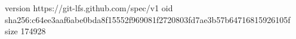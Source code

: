version https://git-lfs.github.com/spec/v1
oid sha256:c64ee3aaf6abe0bda8f15552f969081f2720803fd7ae3b57b64716815926105f
size 174928
